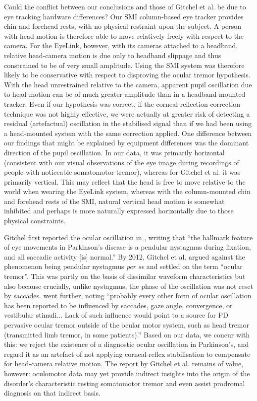 \documentclass[jou,a4paper]{apa6}
\begin{document}
Could the conflict between our conclusions and those of Gitchel et al. be due to eye tracking hardware differences? Our SMI column-based eye tracker provides chin and forehead rests, with no physical restraint upon the subject. A person with head motion is therefore able to move relatively freely with respect to the camera. For the EyeLink, however, with its cameras attached to a headband, relative head-camera motion is due only to headband slippage and thus constrained to be of very small amplitude. Using the SMI system was therefore likely to be conservative with respect to disproving the ocular tremor hypothesis. With the head unrestrained relative to the camera, apparent pupil oscillation due to head motion can be of much greater amplitude than in a headband-mounted tracker. Even if our hypothesis was correct, if the corneal reflection correction technique was not highly effective, we were actually at greater risk of detecting a residual (artefactual) oscillation in the stabilised signal than if we had been using a head-mounted system with the same correction applied. One difference between our findings that might be explained by equipment differences was the dominant direction of the pupil oscillation. In our data, it was primarily horizontal (consistent with our visual observations of the eye image during recordings of people with noticeable somatomotor tremor), whereas for Gitchel et al. it was primarily vertical. This may reflect that the head is free to move relative to the world when wearing the EyeLink system, whereas with the column-mounted chin and forehead rests of the SMI, natural vertical head motion is somewhat inhibited and perhaps is more naturally expressed horizontally due to those physical constraints.

Gitchel first reported the ocular oscillation in \citeyear{Gitchel2009Oculomotor-cont}, writing that ``the hallmark feature of eye movements in Parkinson's disease is a pendular nystagmus during fixation, and all saccadic activity [is] normal.'' By 2012, Gitchel et al. argued against the phenomenon being pendular nystagmus \textit{per se} and settled on the term ``ocular tremor''. This was partly on the basis of dissimilar waveform characteristics but also because crucially, unlike nystagmus, the phase of the oscillation was not reset by saccades. \citet{Leigh2013Tremor-of-the-e} went further, noting ``probably every other form of ocular oscillation has been reported to be influenced by saccades, gaze angle, convergence, or vestibular stimuli... Lack of such influence would point to a source for PD pervasive ocular tremor outside of the ocular motor system, such as head tremor (transmitted limb tremor, in some patients).'' Based on our data, we concur with this: we reject the existence of a diagnostic ocular oscillation in Parkinson's, and regard it as an artefact of not applying corneal-reflex stabilisation to compensate for head-camera relative motion. The report by Gitchel et al. remains of value, however: oculomotor data may yet provide indirect insights into the origin of the disorder's characteristic resting somatomotor tremor and even assist prodromal diagnosis on that indirect basis.
\end{document}
